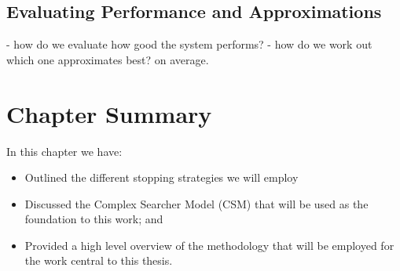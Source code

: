 \subsection{Evaluating Performance and Approximations}
- how do we evaluate how good the system performs?
- how do we work out which one approximates best? on average.



\section{Chapter Summary}
In this chapter we have:

\begin{itemize}
    
    \item{Outlined the different stopping strategies we will employ}
    \item{Discussed the Complex Searcher Model (CSM) that will be used as the foundation to this work; and}
    \item{Provided a high level overview of the methodology that will be employed for the work central to this thesis.}
    
\end{itemize}